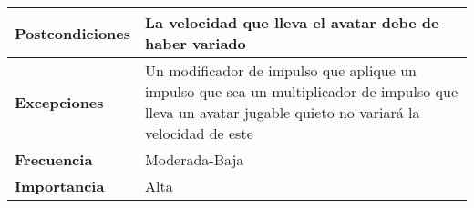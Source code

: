 \begin{tabularx}{\columnwidth}{l|l}
\begin{minipage}{0.25\columnwidth}
\textbf{Postcondiciones} 
\end{minipage}
&
\begin{minipage}{0.65\columnwidth}
La velocidad que lleva el avatar debe de haber variado
\end{minipage}
\\ \hline

\begin{minipage}{0.25\columnwidth}
\textbf{Excepciones} 
\end{minipage}
&
\begin{minipage}{0.65\columnwidth}
Un modificador de impulso que aplique un impulso que sea un multiplicador de impulso que lleva un avatar jugable quieto no variará la velocidad de este 
\end{minipage}
\\ \hline

\begin{minipage}{0.25\columnwidth}
\textbf{Frecuencia} 
\end{minipage}
&
\begin{minipage}{0.65\columnwidth}
Moderada-Baja
\end{minipage}
\\ \hline

\begin{minipage}{0.25\columnwidth}
\textbf{Importancia} 
\end{minipage}
&
\begin{minipage}{0.65\columnwidth}
Alta
\end{minipage}
\\ \hline
\end{tabularx}

